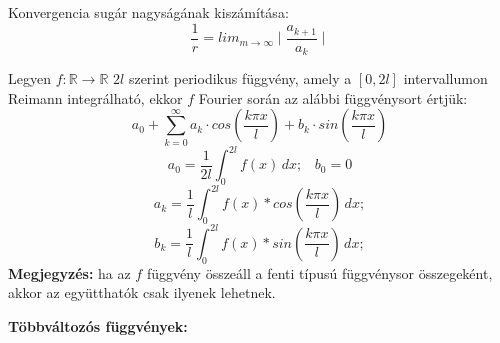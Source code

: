 \documentclass[11pt,a4paper]{article}
\begin{document}
\begin{tcolorbox}[colback=blue!5!white,colframe=blue!70!black,title= 8. Konvergencia sugár{,} konvergencia tartomány]
Konvergencia sugár nagyságának kiszámítása:
$$\frac{1}{r} = lim_{m \to \infty} \mid \frac{a_{k +1}}{a_k} \mid$$
\end{tcolorbox}
\begin{tcolorbox}[colback=blue!5!white,colframe=blue!70!black,title= 9. Fourier-sor]
Legyen \( f : \mathbb{R} \to \mathbb{R}\) \(2l\) szerint periodikus függvény, amely a \([0, 2l]\) intervallumon Reimann integrálható, ekkor \(f\) Fourier során az alábbi függvénysort értjük:
$$ a_0 + \sum_{k=0}^{\infty} a_k\cdot cos(\frac{k\pi x}{l}) + b_k\cdot sin(\frac{k \pi x}{l})$$
$$a_0 = \frac{1}{2l} \int_{0}^{2l} f(x)\,dx; \hspace{10pt}b_0 = 0 $$
$$a_k = \frac{1}{l} \int_{0}^{2l} f(x)* cos(\frac{k \pi x}{l})\,dx;$$
$$b_k = \frac{1}{l} \int_{0}^{2l} f(x)* sin(\frac{k \pi x}{l})\,dx;$$
\textbf{Megjegyzés:} ha az \(f\) függvény összeáll a fenti típusú függvénysor összegeként, akkor az együtthatók csak ilyenek lehetnek.
\begin{center}
\end{center}
\end{tcolorbox}

\newpage
\textbf{Többváltozós függvények:}
\end{document}

